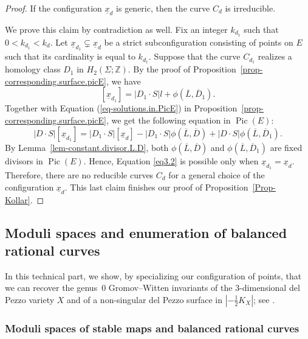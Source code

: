 \documentclass[10pt,a4paper]{article}
\numberwithin{equation}{section}
\theoremstyle{definition}
\theoremstyle{plain}
\theoremstyle{remark}
\newenvironment{claim}[1]{\renewcommand\theinnercustomclaim{#1}\innercustomclaim}{\endinnercustomclaim}
\newcommand{\Z}{\mathbb{Z}}
\DeclareMathOperator{\Pic}{Pic}
\begin{document}
\begin{proof}
\begin{claim}{2C}\label{lem44}
  If the configuration $\underline{x}_d$ is generic, then the curve $C_d$ is irreducible.
\end{claim}

We prove this claim  by contradiction as well. 
Fix an integer $k_{d_1}$ such that $0<k_{d_1}<k_d$. Let $\underline{x}_{d_1}\subsetneq \underline{x}_d$ be a strict subconfiguration consisting of points on $E$ such that its cardinality is equal to $k_{d_1}$. Suppose that the curve $C_{d_1}$ realizes a homology class $D_{1}$ in $H_2(\Sigma;\Z)$. By the proof of Proposition~\ref{prop-corresponding.surface.picE}, we have
$$\left[\underline{x}_{d_1}\right]=|D_1\cdot S|l+\phi\left(\overline{L},\overline{D}_1\right).$$
Together with Equation (\ref{eq-solutions.in.PicE}) in Proposition~\ref{prop-corresponding.surface.picE}, we get the following equation in $\Pic(E)$: 
\begin{equation}\label{eq3.2}
    |D\cdot S|\left[\underline{x}_{d_1}\right]=|D_1\cdot S|\left[\underline{x}_d\right]-|D_1\cdot S|\phi \left(\overline{L},\overline{D}\right)+|D\cdot S|\phi\left(\overline{L},\overline{D}_1\right).
\end{equation}
By Lemma~\ref{lem-constant.divisor.L.D}, both $\phi (\overline{L},\overline{D})$ and $\phi(\overline{L},\overline{D}_1)$ are fixed divisors in $\Pic(E)$. Hence, Equation \eqref{eq3.2} is possible only when $\underline{x}_{d_1}=\underline{x}_{d}$. Therefore, there are no reducible curves $C_d$ for a general choice of the configuration $\underline{x}_{d}$.  
This last claim finishes our proof of Proposition~\ref{Prop-Kollar}.
    \end{proof}

\subsection{Moduli spaces and enumeration of balanced rational  curves}
In this technical part, we show, by specializing our configuration of points, that we can recover the genus~$0$ Gromov--Witten invariants of the $3$-dimensional del Pezzo variety $X$ and of a non-singular del Pezzo surface in $|-\frac{1}{2}K_X|$; see \cite[Section 5]{brugalle2016pencils}. 

\subsubsection{Moduli spaces of stable maps and balanced rational curves} 
\end{document}
